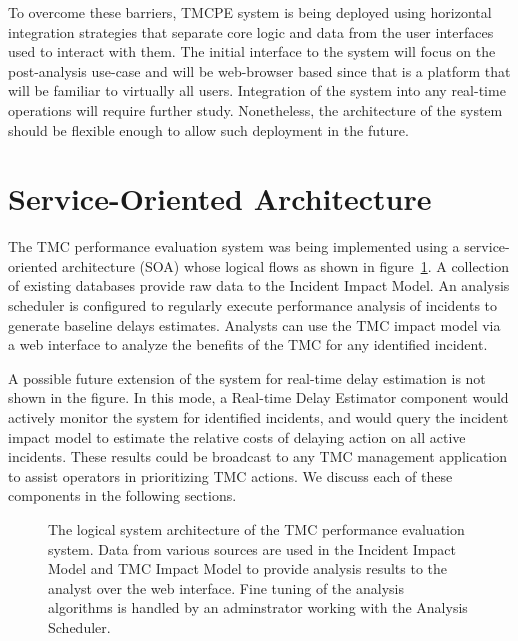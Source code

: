 \documentclass[12pt]{report}
\newcommand{\inputTikZ}[1]{%
    \begin{singlespace}
    \end{singlespace}
  }
\newcommand{\inputTikZ}[1]{%
    \begin{singlespace}
    \beginpgfgraphicnamed{#1-external}%
    \endpgfgraphicnamed%
    \end{singlespace}
  }
\newcounter{time}
\newcounter{space}
\begin{document}
To overcome these barriers, \ac{TMCPE} system is being deployed using horizontal
integration strategies that separate core logic and data from the user
interfaces used to interact with them.  The initial interface to the system will
focus on the post-analysis use-case and will be web-browser based since that is
a platform that will be familiar to virtually all users.  Integration of the
system into any real-time operations will require further study.  Nonetheless,
the architecture of the system should be flexible enough to allow such
deployment in the future.

\section{Service-Oriented Architecture}
\label{sec:soa}

The \ac{TMC} performance evaluation system was being implemented using a
service-oriented architecture (SOA) whose logical flows as shown in
figure~\ref{fig:logical-system-arch}. A collection of existing databases provide
raw data to the Incident Impact Model.  An analysis scheduler is configured to
regularly execute performance analysis of incidents to generate baseline delays
estimates.  Analysts can use the \ac{TMC} impact model via a web interface to
analyze the benefits of the \ac{TMC} for any identified incident.

A possible future extension of the system for real-time delay estimation is not
shown in the figure. In this mode, a Real-time Delay Estimator component would
actively monitor the system for identified incidents, and would query the
incident impact model to estimate the relative costs of delaying action on all
active incidents. These results could be broadcast to any \ac{TMC} management
application to assist operators in prioritizing \ac{TMC} actions.  We discuss
each of these components in the following sections.
\begin{figure}[t]
  \begin{center}
    \inputTikZ{figs/status}
    \caption{The logical system architecture of the TMC performance evaluation
      system.  Data from various sources are used in the Incident Impact Model
      and TMC Impact Model to provide analysis results to the analyst over the
      web interface.  Fine tuning of the analysis algorithms is handled by an
      adminstrator working with the Analysis Scheduler.}
    \label{fig:logical-system-arch}
  \end{center}
\end{figure}
\end{document}
